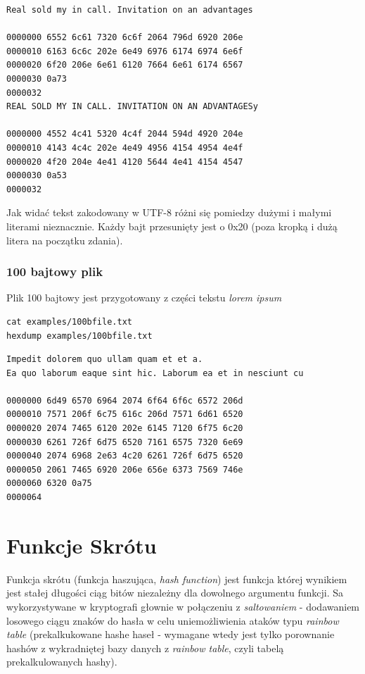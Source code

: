 \documentclass[11pt]{article}
\begin{document}
\begin{verbatim}
Real sold my in call. Invitation on an advantages

0000000 6552 6c61 7320 6c6f 2064 796d 6920 206e
0000010 6163 6c6c 202e 6e49 6976 6174 6974 6e6f
0000020 6f20 206e 6e61 6120 7664 6e61 6174 6567
0000030 0a73                                   
0000032
REAL SOLD MY IN CALL. INVITATION ON AN ADVANTAGESy

0000000 4552 4c41 5320 4c4f 2044 594d 4920 204e
0000010 4143 4c4c 202e 4e49 4956 4154 4954 4e4f
0000020 4f20 204e 4e41 4120 5644 4e41 4154 4547
0000030 0a53                                   
0000032
\end{verbatim}
Jak widać tekst zakodowany w UTF-8 różni się pomiedzy dużymi i małymi literami nieznacznie. Każdy bajt przesunięty jest o 0x20 (poza kropką i dużą litera na początku zdania).

\subsubsection{100 bajtowy plik}
\label{sec:org12a1eae}

Plik 100 bajtowy jest przygotowany z części tekstu \emph{lorem ipsum}
\begin{verbatim}
cat examples/100bfile.txt
hexdump examples/100bfile.txt
\end{verbatim}

\begin{verbatim}
Impedit dolorem quo ullam quam et et a.
Ea quo laborum eaque sint hic. Laborum ea et in nesciunt cu

0000000 6d49 6570 6964 2074 6f64 6f6c 6572 206d
0000010 7571 206f 6c75 616c 206d 7571 6d61 6520
0000020 2074 7465 6120 202e 6145 7120 6f75 6c20
0000030 6261 726f 6d75 6520 7161 6575 7320 6e69
0000040 2074 6968 2e63 4c20 6261 726f 6d75 6520
0000050 2061 7465 6920 206e 656e 6373 7569 746e
0000060 6320 0a75                              
0000064
\end{verbatim}

\section{Funkcje Skrótu}
\label{sec:orgacf147e}
Funkcja skrótu (funkcja haszująca, \emph{hash function}) jest funkcja której wynikiem jest stałej długości ciąg bitów niezależny dla dowolnego argumentu funkcji. Sa wykorzystywane w kryptografi głownie w połączeniu z \emph{saltowaniem} - dodawaniem losowego ciągu znaków do hasła w celu uniemożliwienia ataków typu \emph{rainbow table} (prekalkukowane hashe haseł - wymagane wtedy jest tylko porownanie hashów z wykradniętej bazy danych z \emph{rainbow table}, czyli tabelą prekalkulowanych hashy).
\end{document}
